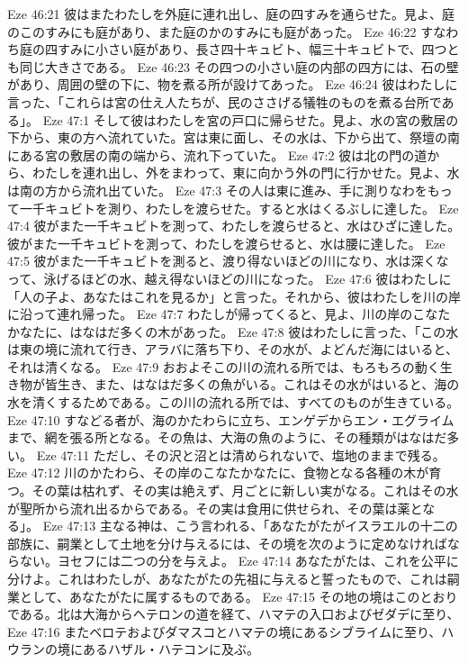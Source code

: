 Eze 46:21  彼はまたわたしを外庭に連れ出し、庭の四すみを通らせた。見よ、庭のこのすみにも庭があり、また庭のかのすみにも庭があった。
Eze 46:22  すなわち庭の四すみに小さい庭があり、長さ四十キュビト、幅三十キュビトで、四つとも同じ大きさである。
Eze 46:23  その四つの小さい庭の内部の四方には、石の壁があり、周囲の壁の下に、物を煮る所が設けてあった。
Eze 46:24  彼はわたしに言った、「これらは宮の仕え人たちが、民のささげる犠牲のものを煮る台所である」。
Eze 47:1  そして彼はわたしを宮の戸口に帰らせた。見よ、水の宮の敷居の下から、東の方へ流れていた。宮は東に面し、その水は、下から出て、祭壇の南にある宮の敷居の南の端から、流れ下っていた。
Eze 47:2  彼は北の門の道から、わたしを連れ出し、外をまわって、東に向かう外の門に行かせた。見よ、水は南の方から流れ出ていた。
Eze 47:3  その人は東に進み、手に測りなわをもって一千キュビトを測り、わたしを渡らせた。すると水はくるぶしに達した。
Eze 47:4  彼がまた一千キュビトを測って、わたしを渡らせると、水はひざに達した。彼がまた一千キュビトを測って、わたしを渡らせると、水は腰に達した。
Eze 47:5  彼がまた一千キュビトを測ると、渡り得ないほどの川になり、水は深くなって、泳げるほどの水、越え得ないほどの川になった。
Eze 47:6  彼はわたしに「人の子よ、あなたはこれを見るか」と言った。それから、彼はわたしを川の岸に沿って連れ帰った。
Eze 47:7  わたしが帰ってくると、見よ、川の岸のこなたかなたに、はなはだ多くの木があった。
Eze 47:8  彼はわたしに言った、「この水は東の境に流れて行き、アラバに落ち下り、その水が、よどんだ海にはいると、それは清くなる。
Eze 47:9  おおよそこの川の流れる所では、もろもろの動く生き物が皆生き、また、はなはだ多くの魚がいる。これはその水がはいると、海の水を清くするためである。この川の流れる所では、すべてのものが生きている。
Eze 47:10  すなどる者が、海のかたわらに立ち、エンゲデからエン・エグライムまで、網を張る所となる。その魚は、大海の魚のように、その種類がはなはだ多い。
Eze 47:11  ただし、その沢と沼とは清められないで、塩地のままで残る。
Eze 47:12  川のかたわら、その岸のこなたかなたに、食物となる各種の木が育つ。その葉は枯れず、その実は絶えず、月ごとに新しい実がなる。これはその水が聖所から流れ出るからである。その実は食用に供せられ、その葉は薬となる」。
Eze 47:13  主なる神は、こう言われる、「あなたがたがイスラエルの十二の部族に、嗣業として土地を分け与えるには、その境を次のように定めなければならない。ヨセフには二つの分を与えよ。
Eze 47:14  あなたがたは、これを公平に分けよ。これはわたしが、あなたがたの先祖に与えると誓ったもので、これは嗣業として、あなたがたに属するものである。
Eze 47:15  その地の境はこのとおりである。北は大海からヘテロンの道を経て、ハマテの入口およびゼダデに至り、
Eze 47:16  またベロテおよびダマスコとハマテの境にあるシブライムに至り、ハウランの境にあるハザル・ハテコンに及ぶ。
